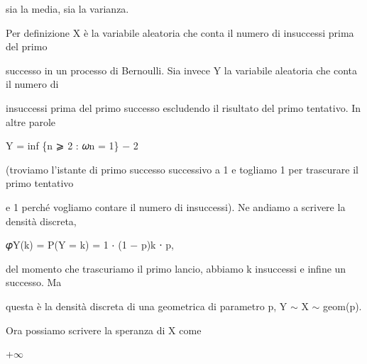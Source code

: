 \documentclass[a4paper,portrait,12pt]{article}
\begin{document}
\begin{flushleft}
sia la media, sia la varianza.
\end{flushleft}


\begin{flushleft}
Per definizione X \`{e} la variabile aleatoria che conta il numero di insuccessi prima del primo
\end{flushleft}


\begin{flushleft}
successo in un processo di Bernoulli. Sia invece Y la variabile aleatoria che conta il numero di
\end{flushleft}


\begin{flushleft}
insuccessi prima del primo successo escludendo il risultato del primo tentativo. In altre parole
\end{flushleft}


\begin{flushleft}
Y = inf \{n ⩾ 2 : 𝜔n = 1\} $-$ 2
\end{flushleft}


\begin{flushleft}
(troviamo l'istante di primo successo successivo a 1 e togliamo 1 per trascurare il primo tentativo
\end{flushleft}


\begin{flushleft}
e 1 perch\'{e} vogliamo contare il numero di insuccessi). Ne andiamo a scrivere la densit\`{a} discreta,
\end{flushleft}


\begin{flushleft}
𝜑Y(k) = P(Y = k) = 1 ⋅ (1 $-$ p)k ⋅ p,
\end{flushleft}


\begin{flushleft}
del momento che trascuriamo il primo lancio, abbiamo k insuccessi e infine un successo. Ma
\end{flushleft}


\begin{flushleft}
questa \`{e} la densit\`{a} discreta di una geometrica di parametro p, Y $\sim$ X $\sim$ geom(p).
\end{flushleft}


\begin{flushleft}
Ora possiamo scrivere la speranza di X come
\end{flushleft}


+$\infty$
\end{document}
